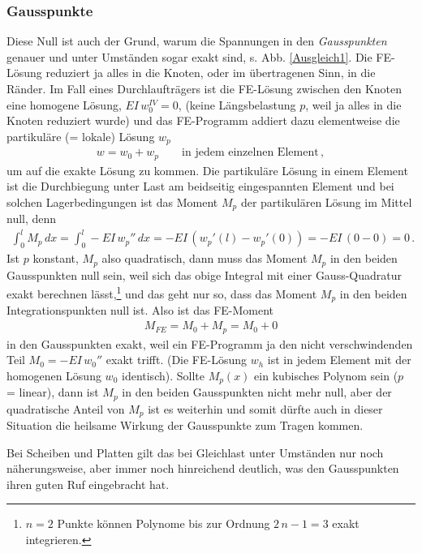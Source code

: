 {\textcolor{sectionTitleBlue}{\subsubsection*{Gausspunkte}}}
Diese Null ist auch der Grund, warum die Spannungen in den {\em Gausspunkten\/} genauer und unter Umst\"{a}nden sogar exakt sind, s. Abb. \ref{Ausgleich1}. Die FE-L\"{o}sung reduziert ja alles in die Knoten, oder im \"{u}bertragenen Sinn, in die R\"{a}nder. Im Fall eines Durchlauftr\"{a}gers ist die FE-L\"{o}sung zwischen den Knoten eine homogene L\"{o}sung, $EI\,w_0^{IV} = 0$, (keine L\"{a}ngsbelastung $p$, weil ja alles in die Knoten reduziert wurde) und das FE-Programm addiert dazu elementweise die partikul\"{a}re (= lokale) L\"{o}sung $w_p$
\begin{align}
w = w_0 + w_p \qquad \text{in jedem einzelnen Element}\,,
\end{align}
um auf die exakte L\"{o}sung zu kommen. Die partikul\"{a}re L\"{o}sung in einem Element ist die Durchbiegung unter Last am beidseitig eingespannten Element und bei solchen Lagerbedingungen ist das Moment $M_p$ der partikul\"{a}ren L\"{o}sung im Mittel null, denn
\begin{align}\label{Eq3}
\int_{0}^{l} M_p\,dx = \int_{0}^{l} - EI\,w_p''\,dx = - EI\,(w_p'(l) - w_p'(0)) = - EI\, ( 0-0) = 0\,.
\end{align}
Ist $p $ konstant, $M_p$ also quadratisch, dann muss das Moment $M_p$ in den beiden Gausspunkten null sein, weil sich das obige Integral mit einer Gauss-Quadratur exakt berechnen l\"{a}sst,\footnote{$n = 2$ Punkte k\"{o}nnen Polynome bis zur Ordnung $2\,n - 1 = 3$ exakt integrieren.} und das geht nur so, dass das Moment $M_p$ in den beiden Integrationspunkten null ist. Also ist das FE-Moment
\begin{align}
M_{FE} = M_0 + M_p = M_0 + 0
\end{align}
in den Gausspunkten exakt, weil ein FE-Programm ja den nicht verschwindenden Teil $M_0 = - EI\,w_0''$ exakt trifft. (Die FE-L\"{o}sung $w_h$ ist in jedem Element mit der homogenen L\"{o}sung $w_0$ identisch). Sollte $M_p(x)$ ein kubisches Polynom sein ($p$ = linear), dann ist $M_p$ in den beiden Gausspunkten nicht mehr null, aber der quadratische Anteil von $M_p $ ist es weiterhin und somit d\"{u}rfte auch in dieser Situation die heilsame Wirkung der Gausspunkte zum Tragen kommen.

Bei Scheiben und Platten gilt das bei Gleichlast unter Umst\"{a}nden nur noch n\"{a}herungsweise, aber immer noch hinreichend deutlich, was den Gauss\-punkten ihren guten Ruf eingebracht hat.

